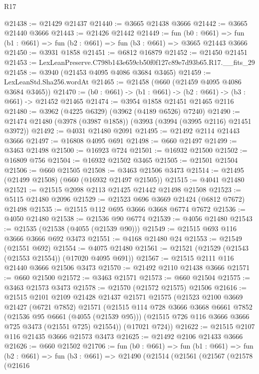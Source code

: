 \begin{lexlean}{R17}
\begin{coremodule}
@21438 := @21429 @21437
@21440 := @3665 @21438 @3666
@21442 := @3665 @21440 @3666
@21443 := @21426 @21442
@21449 := fun (b0 : @661) =>
  fun (b1 : @661) => fun (b2 : @661) => fun (b3 : @661) => @3665 @21443 @3666
@21450 := @3931 @1858
@21451 := @6812 @16879
@21452 := @21450 @21451
@21453 := LexLeanPreserve.C798b143e659cb50f0f127c89e7d93b65.R17.__fits_29
@21458 := @3940 (@21453 @4095 @4086 @3684 @3465)
@21459 := LexLeanStd.Sha256.wordAt
@21465 := @21458 (@660 (@21459 @4095 @4086 @3684 @3465))
@21470 := (b0 : @661) -> (b1 : @661) -> (b2 : @661) -> (b3 : @661) -> @21452 @21465
@21474 := @3954 @1858 @21451 @21465 @2116
@21480 := @3962 (@4225 @6329) (@3962 (@4189 @6526) @7240)
@21490 := @21474 @21480 (@3978 (@3987 @1858)) (@3993 (@3994 (@3995 @2116) @21451 @3972))
@21492 := @4031 @21480 @2091
@21495 := @21492 @2114 @21443 @3666
@21497 := @16808 @4095 @691
@21498 := @660 @21497
@21499 := @3463 @21498
@21500 := @16923 @724
@21501 := @16932 @21500
@21502 := @16809 @756
@21504 := @16932 @21502 @3465
@21505 := @21501 @21504
@21506 := @660 @21505
@21508 := @3463 @21506 @3473
@21514 := @21495 (@21499 @21508) (@660 (@16932 @21497 @21505))
@21515 := @4041 @21480
@21521 := @21515 @2098 @2113 @21425 @21442 @21498 @21508
@21523 := @5115 @21480 @2096
@21529 := @21523 @696 @3669 @21424 (@6812 @7672) @21498
@21535 := @21515 @112 @695 @3666 @3668 @6774 @7672
@21536 := @4050 @21480
@21538 := @21536 @90 @6774
@21539 := @4056 @21480
@21543 := @21535 (@21538 (@4055 (@21539 @90)))
@21549 := @21515 @693 @116 @3666 @3666 @692 @3473
@21551 := @4168 @21480 @24
@21553 := @21549 (@21551 @692)
@21554 := @4075 @21480
@21561 := @21521 (@21529 (@21543 (@21553 @21554)) (@17020 @4095 @691))
@21567 := @21515 @2111 @116 @21440 @3666 @21506 @3473
@21570 := @21492 @2110 @21438 @3666
@21571 := @660 @21500
@21572 := @3463 @21571
@21573 := @660 @21504
@21575 := @3463 @21573 @3473
@21578 := @21570 (@21572 @21575) @21506
@21616 := @21515
    @2101
    @2109
    @21428
    @21437
    @21571
    @21575
    (@21523
      @2100
      @3669
      @21427
      (@6721 @7852)
      @21571
      (@21515
        @114
        @728
        @3666
        @3668
        @6661
        @7852
        (@21536 @95 @6661 (@4055 (@21539 @95)))
        (@21515 @726 @116 @3666 @3666 @725 @3473 (@21551 @725) @21554))
      (@17021 @724))
@21622 := @21515 @2107 @116 @21435 @3666 @21573 @3473
@21625 := @21492 @2106 @21433 @3666
@21626 := @660 @21502
@21706 := fun (b0 : @661) =>
  fun (b1 : @661) =>
  fun (b2 : @661) =>
  fun (b3 : @661) =>
  @21490
    (@21514
      (@21561
        (@21567
          (@21578
            (@21616

\end{coremodule}
\end{lexlean}
